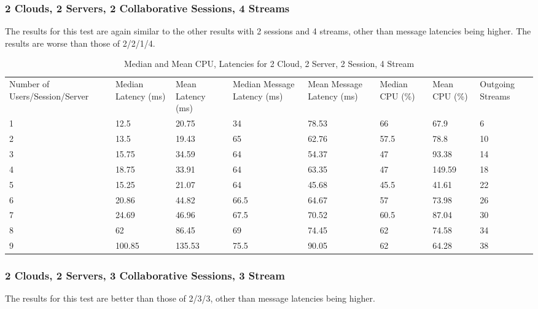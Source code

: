 \clearpage\subsubsection{2 Clouds, 2 Servers, 2 Collaborative Sessions, 4 Streams}

The results for this test are again similar to the other results with 2 sessions and 4 streams, other than message latencies being higher. The results are worse than those of 2/2/1/4.

\begin{table}
\caption{Median and Mean CPU, Latencies for 2 Cloud, 2 Server, 2 Session, 4 Stream}
\label{table:2cld_2serv_2sess_4str}
\begin{tabu} to\linewidth{|X[c]|X[c]|X[c]|X[c]|X[c]|X[c]|X[c]|X[c]|}
\everyrow{\hline}
\hline
Number of Users/Session/Server & Median Latency (ms) & Mean Latency (ms) & Median Message Latency (ms) & Mean Message Latency (ms) & Median CPU (\%) & Mean CPU (\%) & Outgoing Streams\\
1 & 12.5 & 20.75 & 34 & 78.53 & 66 & 67.9 & 6 \\
2 & 13.5 & 19.43 & 65 & 62.76 & 57.5 & 78.8 & 10 \\
3 & 15.75 & 34.59 & 64 & 54.37 & 47 & 93.38 & 14 \\
4 & 18.75 & 33.91 & 64 & 63.35 & 47 & 149.59 & 18 \\
5 & 15.25 & 21.07 & 64 & 45.68 & 45.5 & 41.61 & 22 \\
6 & 20.86 & 44.82 & 66.5 & 64.67 & 57 & 73.98 & 26 \\
7 & 24.69 & 46.96 & 67.5 & 70.52 & 60.5 & 87.04 & 30 \\
8 & 62 & 86.45 & 69 & 74.45 & 62 & 74.58 & 34 \\
9 & 100.85 & 135.53 & 75.5 & 90.05 & 62 & 64.28 & 38 \\
\end{tabu}
\end{table}

\clearpage\subsubsection{2 Clouds, 2 Servers, 3 Collaborative Sessions, 3 Stream}

The results for this test are better than those of 2/3/3, other than message latencies being higher.

